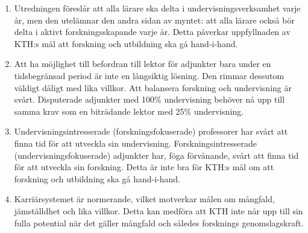 \begin{enumerate}
  \item Utredningen föreslår att alla lärare ska delta i 
    undervisningsverksamhet varje år,
    men den utelämnar den andra sidan av myntet: att alla lärare också bör 
    delta i aktivt forskningsskapande varje år.
    Detta påverkar uppfyllnaden av KTH:s mål att forskning och utbildning ska 
    gå hand-i-hand.
  \item Att ha möjlighet till befordran till lektor för adjunkter bara under en 
    tidsbegränsad period är inte en långsiktig lösning.
    Den rimmar dessutom väldigt dåligt med lika villkor.
    Att balansera forskning och undervisning är svårt.
    Disputerade adjunkter med 100\% undervisning behöver nå upp till samma krav 
    som en biträdande lektor med 25\% undervisning.
  \item Undervisningsintresserade (forskningsfokuserade) professorer har svårt 
    att finna tid för att utveckla sin undervisning.
    Forskningsintresserade (undervisningsfokuserade) adjunkter har, föga 
    förvånande, svårt att finna tid för att utveckla sin forskning.
    Detta är inte bra för KTH:s mål om att forskning och utbildning ska gå 
    hand-i-hand.
  \item Karriärsystemet är normerande, vilket motverkar målen om mångfald, 
    jämställdhet och lika villkor.
    Detta kan medföra att KTH inte når upp till sin fulla potential när det 
    gäller mångfald och således forsknings genomslagskraft.
\end{enumerate}
